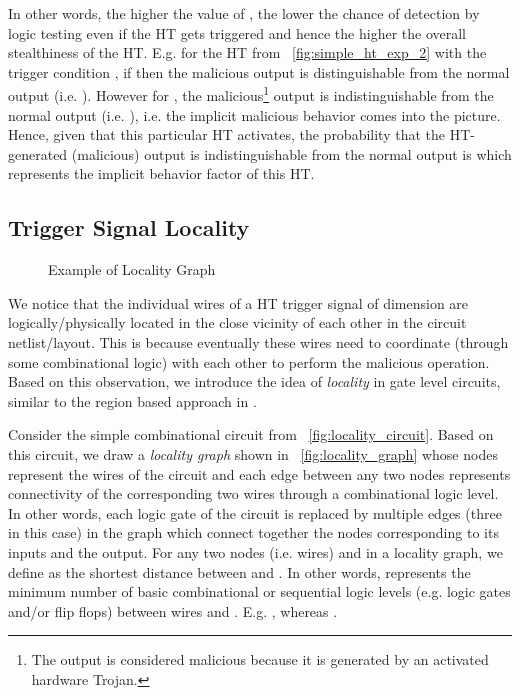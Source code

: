 \documentclass[10pt,journal,compsoc]{IEEEtran}
\begin{document}
In other words, the higher the value of , the lower the chance of detection by logic testing even if the HT gets triggered and hence the higher the overall stealthiness of the HT.
E.g. for the HT from \figurename~\ref{fig:simple_ht_exp_2} with the trigger condition , if  then the malicious output  is distinguishable from the normal output (i.e. ).
However for , the malicious\footnote{The output is considered malicious because it is generated by an activated hardware Trojan.} output  is indistinguishable from the normal output (i.e. ), i.e. the implicit malicious behavior comes into the picture.
Hence, given that this particular HT activates, the probability that the HT-generated (malicious) output is indistinguishable from the normal output is  which represents the implicit behavior factor of this HT.





\subsection{Trigger Signal Locality }

\begin{figure}[!t]
\centering
{}
\hfil
{}
\caption{Example of Locality Graph}
\label{fig:locality_graph_example}
\end{figure}

We notice that the individual wires of a HT trigger signal of dimension  are logically/physically located in the close vicinity of each other in the circuit netlist/layout.
This is because eventually these wires need to coordinate (through some combinational logic) with each other to perform the malicious operation.
Based on this observation, we introduce the idea of \textit{locality} in gate level circuits, similar to the region based approach in \cite{trustedRTL}.

Consider the simple combinational circuit from \figurename~\ref{fig:locality_circuit}.
Based on this circuit, we draw a \textit{locality graph} shown in \figurename~\ref{fig:locality_graph} whose nodes represent the wires of the circuit and each edge between any two nodes represents connectivity of the corresponding two wires through a combinational logic level. 
In other words, each logic gate of the circuit is replaced by multiple edges (three in this case) in the graph which connect together the nodes corresponding to its inputs and the output.
For any two nodes (i.e. wires)  and  in a locality graph, we define  as the shortest distance between  and .
In other words,  represents the minimum number of basic combinational or sequential logic levels (e.g. logic gates and/or flip flops) between wires  and .
E.g. , whereas .
\end{document}
